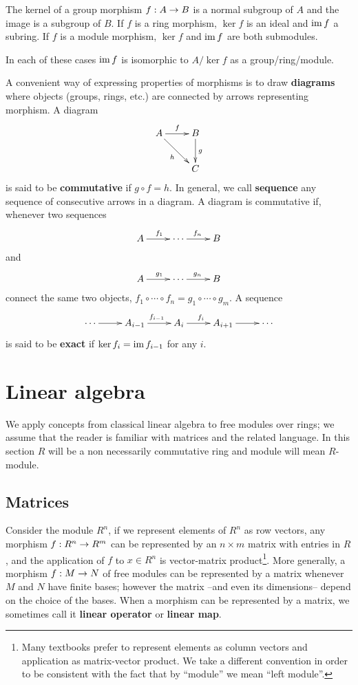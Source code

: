 \begin{proposition}
  The kernel of a group morphism $f:A\rightarrow B$ is a normal subgroup of
  $A$ and the image is a subgroup of $B$.  If $f$ is a ring morphism,
  $\ker f$ is an ideal and $\operatorname{im} f$ a subring. If $f$ is a module
  morphism, $\ker f$ and $\operatorname{im} f$ are both submodules.
  
  In each of these cases $\operatorname{im} f$ is isomorphic to $A/\ker f$ as a
  group/ring/module.
\end{proposition}

A convenient way of expressing properties of morphisms is to draw
\textbf{diagrams} where objects (groups, rings, etc.)
are connected by arrows representing morphism. A diagram
\[\xymatrix{A\ar[r]^f\ar[dr]_h & B \ar[d]^g\\&C}\]
is said to be \textbf{commutative} if
$g\circ f = h$. In general, we call \textbf{sequence}
any sequence of consecutive arrows in a diagram. A diagram is
commutative if, whenever two sequences
\[\xymatrix{A\ar[r]^{f_1} & \cdots \ar[r]^{f_n} & B}\]
and
\[\xymatrix{A\ar[r]^{g_1} & \cdots \ar[r]^{g_n} & B}\]
connect the same two objects, $f_1\circ\cdots\circ
f_n=g_1\circ\cdots\circ g_m$.  A sequence
\[\xymatrix{\cdots \ar[r] & A_{i-1}\ar[r]^{f_{i-1}} & A_i \ar[r]^{f_i}
  & A_{i+1} \ar[r] & \cdots}\]
is said to be 
\textbf{exact} if $\ker f_i = \operatorname{im} f_{i-1}$ for
any $i$.


\section{Linear algebra}
\label{sec:linear-algebra}

We apply concepts from classical linear algebra to free modules over
rings; we assume that the reader is familiar with matrices and the
related language. In this section $R$ will be a non necessarily
commutative ring and module will mean $R$-module.

\subsection{Matrices}
\label{sec:linear-algebra:matrices}

Consider the module $R^n$, if we represent elements of $R^n$ as row
vectors, any morphism $f:R^n\rightarrow R^m$ can be represented by an $n\times
m$ matrix with entries in $R$, and the application of $f$ to $x\in
R^n$ is vector-matrix product\footnote{Many textbooks prefer to
  represent elements as column vectors and application as
  matrix-vector product. We take a different convention in order to be
  consistent with the fact that by ``module'' we mean ``left
  module''.}. More generally, a morphism $f:M\rightarrow N$ of free modules
can be represented by a matrix whenever $M$ and $N$ have finite bases;
however the matrix --and even its dimensions-- depend on the choice of
the bases. When a morphism can be represented by a matrix, we
sometimes call it \textbf{linear operator} or
\textbf{linear map}.

